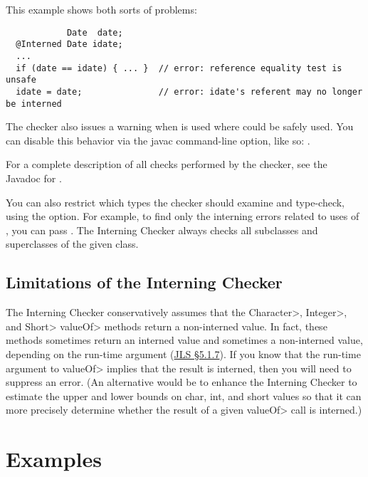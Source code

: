 This example shows both sorts of problems:

\begin{Verbatim}
            Date  date;
  @Interned Date idate;
  ...
  if (date == idate) { ... }  // error: reference equality test is unsafe
  idate = date;               // error: idate's referent may no longer be interned
\end{Verbatim}

\label{lint-dotequals}

The checker also issues a warning when  is used where
\code{==} could be safely used.  You can disable this behavior via the
javac  command-line option, like so: .

For a complete description of all checks performed by
  the checker, see the Javadoc for
  .

\label{checking-class}
You can also restrict which types the checker should examine and type-check,
using the  option.  For example, to find only the
interning errors related to uses of , you can pass
.  The Interning Checker always checks all
subclasses and superclasses of the given class.


\subsection{Limitations of the Interning Checker\label{interning-limitations}}


The Interning Checker conservatively assumes that the \<Character>, \<Integer>,
and \<Short> \<valueOf> methods return a non-interned value.  In fact, these
methods sometimes return an interned value and sometimes a non-interned
value, depending on the run-time argument (\href{https://docs.oracle.com/javase/specs/jls/se8/html/jls-5.html#jls-5.1.7}{JLS
\S5.1.7}).  If you know that the run-time argument to \<valueOf> implies that
the result is interned, then you will need to suppress an error.  (An
alternative would be to enhance the Interning Checker to estimate the upper
and lower bounds on char, int, and short values so that it can more
precisely determine whether the result of a given \<valueOf> call is
interned.)



\section{Examples\label{interning-example}}

